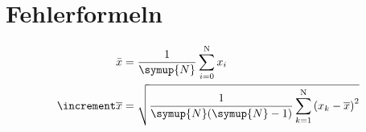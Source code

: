 \section{Fehlerformeln}
\label{sec:anhang}
\begin{align}
      \bar{x} &= \frac{1}{\symup{N}} \sum_{i=0}^\text{N} x_i
      \label{eqn:mittelwert} \\
      \increment\overline{x} &= \sqrt{
      \frac{1}{\symup{N}(\symup{N}-1)}\sum_{k=1}^\text{N}
      \left( x_k - \overline{x} \right)^2}
      \label{eqn:mittelwertfehler}
\end{align}
